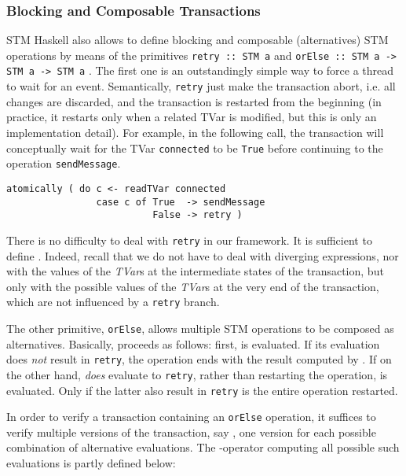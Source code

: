 \documentclass[submission,copyright,creativecommons]{eptcs}
\begin{document}
\subsubsection*{Blocking and Composable Transactions} 
STM Haskell also allows to define blocking and composable (alternatives) STM operations by means of the primitives \texttt{retry :: STM a} and \texttt{orElse :: STM a -> STM a -> STM a} \cite{composable-memory-transactions}.
The first one is an outstandingly simple way to force a thread to wait for an event. Semantically, \texttt{retry} just make the transaction abort, i.e. all changes are discarded, and the transaction is restarted from the beginning (in practice, it restarts only when a related TVar is modified, but this is only an implementation detail). For example, in the following call, the transaction will conceptually wait for the TVar \texttt{connected} to be \texttt{True} before continuing to the operation \texttt{sendMessage}.

\begin{footnotesize}
\begin{verbatim}
atomically ( do c <- readTVar connected
                case c of True  -> sendMessage
                          False -> retry )
\end{verbatim}  
\end{footnotesize}
There is no difficulty to deal with \texttt{retry} in our framework. It is sufficient to define . 
Indeed, recall that we do not have to deal with diverging expressions, nor with the values of the \emph{TVar}s at the intermediate states of the transaction, but only with the possible values of the \emph{TVar}s at the very end of the transaction, which are not influenced by a \texttt{retry} branch.


The other primitive, \texttt{orElse}, allows multiple STM operations to be composed as alternatives. Basically,  proceeds as follows: first,  is evaluated. If its evaluation does \emph{not} result in \texttt{retry}, the operation ends with the result computed by . If on the other hand,  \emph{does} evaluate to \texttt{retry}, rather than restarting the operation,  is evaluated. Only if the latter also result in \texttt{retry} is the entire operation restarted.

In order to verify a transaction  containing an \texttt{orElse} operation, it suffices to verify multiple versions of the transaction, say , one version for each possible combination of alternative evaluations. The -operator computing all possible such evaluations is partly defined below:
\smallskip
\end{document}
